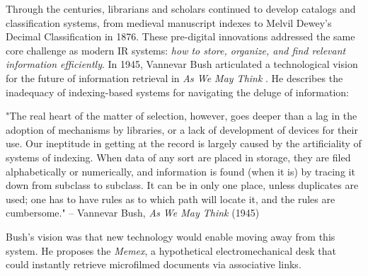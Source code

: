 

Through the centuries, librarians and scholars continued to develop catalogs and classification systems, from medieval manuscript indexes 
 to Melvil Dewey’s Decimal Classification  in 1876. These pre-digital innovations addressed the same core challenge as modern IR systems: \emph{how to store, organize, and find relevant information efficiently}. In 1945, Vannevar Bush articulated a technological vision for the future of information retrieval in \emph{As We May Think} . He describes the inadequacy of indexing-based systems for navigating the deluge of information:


\begin{lavenderkaobox}
"The real heart of the matter of selection, however, goes deeper than a lag in the adoption of mechanisms by libraries, or a lack of development of devices for their use. Our ineptitude in getting at the record is largely caused by the artificiality of systems of indexing. When data of any sort are placed in storage, they are filed alphabetically or numerically, and information is found (when it is) by tracing it down from subclass to subclass. It can be in only one place, unless duplicates are used; one has to have rules as to which path will locate it, and the rules are cumbersome."
\flushright -- Vannevar Bush, \emph{As We May Think} (1945)
\end{lavenderkaobox}


Bush's vision was that new technology would enable moving away from this system. He proposes the \emph{Memex}, a hypothetical electromechanical desk that could instantly retrieve microfilmed documents via associative links.

